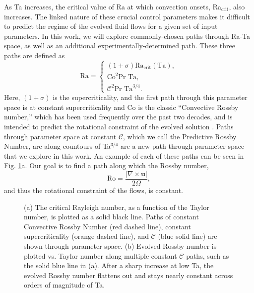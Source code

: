 \documentclass[twocolumn, amsmath, amsfonts, amssymb]{aastex62}
\newcommand{\grad}{\ensuremath{\nabla}}
\begin{document}
As Ta increases, the critical value of Ra at which convection onsets,
Ra$_{\text{crit}}$, also increases. The linked nature of these crucial
control parameters makes it difficult to predict the regime of the evolved
fluid flows for a given set of input parameters. In this work, we will
explore commonly-chosen paths through Ra-Ta space, as well as an additional
experimentally-determined path. These three paths are defined as
\begin{equation}
\text{Ra} = 
\begin{cases}
(1 + \sigma)\text{Ra}_\text{crit}(\text{Ta}), \\
\text{Co}^2\text{Pr Ta}, \\
\mathcal{C}^2 \text{Pr Ta}^{3/4}.
\end{cases}
\label{eqn:paths}
\end{equation}
Here, $(1 + \sigma)$ is the supercriticality, and the first path through
this parameter space is at constant supercriticality and Co is the classic
``Convective Rossby number,'' which has been used frequently over the past
two decades, and is intended to predict the rotational constraint of the
evolved solution \citep{julien&all1996, brummell&all1996}. Paths through parameter
space at constant $\mathcal{C}$, which we call the Predictive Rossby Number,
are along countours of Ta$^{3/4}$ are a new path
through parameter space that we explore in this work. An example of each of these paths
can be seen in Fig. \ref{fig:parameter_space}a.  Our goal is to find a path
along which the Rossby number,
\begin{equation}
\text{Ro} = \frac{|\grad\times \bm{u}|}{2 \Omega},
\label{eqn:ro}
\end{equation}
and thus the rotational constraint of the flows, is constant.



\begin{figure}[h]
\caption{(a) The critical Rayleigh number, as a function of the Taylor number, 
is plotted as a solid black line. Paths of constant Convective Rossby Number
(red dashed line), constant supercriticality (orange dashed line), and 
$\mathcal{C}$ (blue solid line) are shown through parameter space. (b) Evolved
Rossby number is plotted vs. Taylor number along multiple constant $\mathcal{C}$
paths, such as the solid blue line in (a). 
After a sharp increase at low Ta, the evolved Rossby number flattens
out and stays nearly constant across orders of magnitude of Ta.
\label{fig:parameter_space} }
\end{figure}
\end{document}
